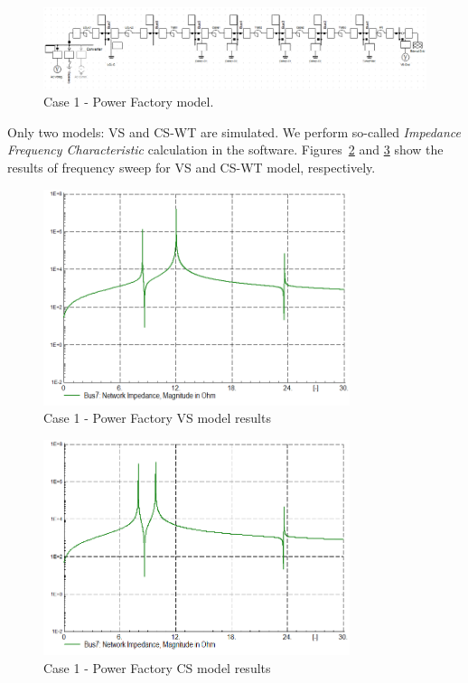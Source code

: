 \documentclass[12pt]{report} %
\begin{document}
\begin{figure}[htb]
	\centering
	\includegraphics[width=1\textwidth]{img/Case1/PF_model.png}
  	\caption{Case 1 - Power Factory model.}
  	\label{fig:c1pfmodel}
\end{figure}
\FloatBarrier

Only two models: VS and CS-WT are simulated. We perform so-called \textit{Impedance Frequency Characteristic} calculation in the software. Figures~\ref{fig:c1pfvs1} and \ref{fig:c1pfcs1} show the results of frequency sweep for VS and CS-WT model, respectively.

\begin{figure}[htb]
	\centering
	\includegraphics[width=0.8\textwidth]{img/Case1/PF_imp7_VS.PNG}
  	\caption{Case 1 - Power Factory VS model results}
  	\label{fig:c1pfvs1}
\end{figure}
\FloatBarrier

\begin{figure}[htb]
	\centering
	\includegraphics[width=0.8\textwidth]{img/Case1/PF_imp7_CS.PNG}
  	\caption{Case 1 - Power Factory CS model results}
  	\label{fig:c1pfcs1}
\end{figure}
\FloatBarrier
\end{document}
